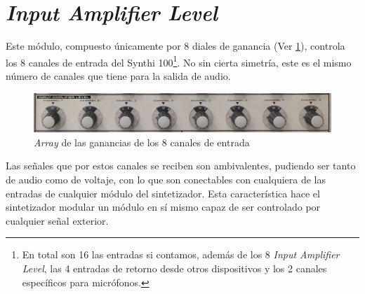 \section[Interfaz OSC]{\textit{Input Amplifier Level}}

Este módulo, compuesto únicamente por 8 diales de ganancia (Ver \ref{fig:input_amplifier_level}), controla los 8 canales de entrada del Synthi 100\footnote{En total son 16 las entradas si contamos, además de los 8 \textit{Input Amplifier Level}, las 4 entradas de retorno desde otros dispositivos y los 2 canales específicos para micrófonos.}. No sin cierta simetría, este es el mismo número de canales que tiene para la salida de audio. 

\begin{figure}
	\centering
	\includegraphics[width=1\textwidth]{images/input_amplifier_level}
	\caption[\textit{Input Amplifier Level}]{\textit{Array} de las ganancias de los 8 canales de entrada}
	\label{fig:input_amplifier_level}
\end{figure}

Las señales que por estos canales se reciben son ambivalentes, pudiendo ser tanto de audio como de voltaje, con lo que son conectables con cualquiera de las entradas de cualquier módulo del sintetizador. Esta característica hace el sintetizador modular un módulo en sí mismo capaz de ser controlado por cualquier señal exterior. 